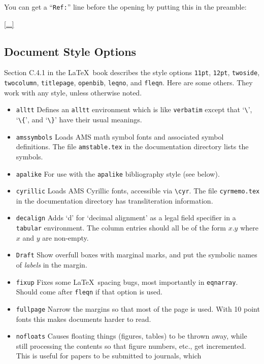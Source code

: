 You can get a ``{\tt Ref:}'' line before the opening by putting
this in the preamble:
\begin{eg}
\ref{...}
\end{eg}

\subsection{Document Style Options}

Section C.4.1 in the \LaTeX\ book describes the style options
\verb|11pt|, \verb|12pt|, \verb|twoside|, \verb|twocolumn|,
\verb|titlepage|, \verb|openbib|, 
\verb|leqno|, and \verb|fleqn|.
Here are some others.
They work with any style, unless otherwise noted.

\begin{itemize}
\item[] \hbox{\tt alltt}
Defines an {\tt alltt} environment which is like {\tt verbatim}
except that `\verb|\|', `\verb|\{|', and `\verb|\}|' have their usual meanings.
\item[] \hbox{\tt amssymbols}
Loads AMS math symbol fonts and associated symbol definitions.
The file {\tt amstable.tex} in the documentation directory
lists the symbols.
\item[] \hbox{\tt apalike}
For use with the \verb|apalike| bibliography style (see below).
\item[] \hbox{\tt cyrillic}
Loads AMS Cyrillic fonts, accessible via \verb|\cyr|.
The file {\tt cyrmemo.tex} in the documentation directory
has transliteration information.
\item[] \hbox{\tt decalign}
Adds `d' for `decimal alignment' as a legal field specifier
in a \verb|tabular| environment.
The column entries should all be of the form $x.y$ where $x$
and $y$ are non-empty.
\item[] \hbox{\tt Draft}
Show overfull boxes with marginal marks, and put the symbolic
names of {\em labels\/} in the margin.
\item[] \hbox{\tt fixup}
Fixes some \LaTeX\ spacing bugs, most importantly in \verb|eqnarray|.
Should come after \verb|fleqn| if that option is used.
\item[] \hbox{\tt fullpage}
Narrow the margins so that most of the page is used.
With 10 point fonts this makes documents harder to read.
\item[] \hbox{\tt nofloats}
Causes floating things (figures, tables) to be thrown
away, while still processing the contents so that figure numbers, etc., get
incremented.  This is useful for papers to be submitted to journals, which

\end{itemize}
